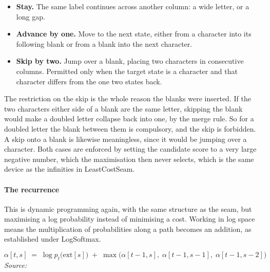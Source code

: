 \begin{itemize}\setlength\itemsep{0pt}
  \item \textbf{Stay.} The same label continues across another column: a wide letter, or a long gap.
  \item \textbf{Advance by one.} Move to the next state, either from a character into its following blank or from a blank into the next character.
  \item \textbf{Skip by two.} Jump over a blank, placing two characters in consecutive columns. Permitted only when the target state is a character and that character differs from the one two states back.
\end{itemize}
The restriction on the skip is the whole reason the blanks were inserted. If the two characters either side of a blank are the same letter, skipping the blank would make a doubled letter collapse back into one, by the merge rule. So for a doubled letter the blank between them is compulsory, and the skip is forbidden. A skip onto a blank is likewise meaningless, since it would be jumping over a character. Both cases are enforced by setting the candidate score to a very large negative number, which the maximisation then never selects, which is the same device as the infinities in LeastCostSeam.


\paragraph{The recurrence}
This is dynamic programming again, with the same structure as the seam, but maximising a log probability instead of minimising a cost. Working in log space means the multiplication of probabilities along a path becomes an addition, as established under LogSoftmax.


\begin{equation}
\alpha[t,s] \;=\; \log p_t\big(\mathrm{ext}[s]\big) \;+\; \max\Big( \alpha[t-1,s],\; \alpha[t-1,s-1],\; \alpha[t-1,s-2] \Big)
\end{equation}
\noindent\emph{Source: }\cite{graves2006}



